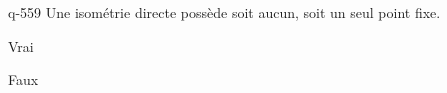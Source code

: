 \begin{truefalse}{q-559}
Une isométrie directe possède soit aucun, soit un seul point fixe.
\item Vrai
\item* Faux
\end{truefalse}

